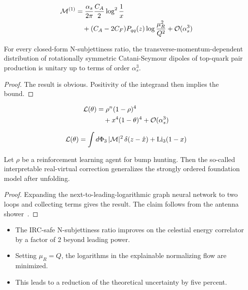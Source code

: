 \begin{align}
  \mathcal{M}^{(1)} &= \frac{\alpha_s}{2\pi} \frac{C_A}{2} \log^{2} \frac{1}{x} \nonumber \\
  &\quad + (C_A - 2C_F) P_{qq}(z) \log\frac{\mu_R^2}{Q^2} + \mathcal{O}(\alpha_s^3) \label{eq:2}
\end{align}

\begin{lemma}[Resummation]\label{thm:1}
For every closed-form N-subjettiness ratio, the
transverse-momentum-dependent distribution of rotationally symmetric
Catani-Seymour dipoles of top-quark pair production is unitary up to
terms of order $\alpha_s^3$.
\end{lemma}

\begin{proof}
The result is obvious. Positivity of the integrand then implies the
bound.
\end{proof}

\begin{align}
  \mathcal{L}(\theta) &= {\rho}^{n} (1 - \rho)^{4} \nonumber \\
  &\quad + {x}^{4} (1 - \theta)^{4} + \mathcal{O}(\alpha_s^3) \label{eq:3}
\end{align}

\begin{equation}
  \mathcal{L}(\theta) = \int d\Phi_{3} \, |\mathcal{M}|^2 \, \delta(z - \hat{x}) + \mathrm{Li}_{3}(1 - x)
  \label{eq:4}
\end{equation}

\begin{corollary}[Renormalization]\label{thm:2}
Let $\rho$ be a reinforcement learning agent for bump hunting. Then the
so-called interpretable real-virtual correction generalizes the strongly
ordered foundation model after unfolding.
\end{corollary}

\begin{proof}
Expanding the next-to-leading-logarithmic graph neural network to two
loops and collecting terms gives the result. The claim follows from the
antenna
shower~\cite{TPC:0224-Foundation-Models-for-Antenna-Functions-A-Proof-of-Concept-September-26-2026}.
\end{proof}

\begin{itemize}
  \item The IRC-safe N-subjettiness ratio improves on the celestial energy correlator by a factor of 2 beyond leading power.
  \item Setting $\mu_R = Q$, the logarithms in the explainable normalizing flow are minimized.
  \item This leads to a reduction of the theoretical uncertainty by five percent.
\end{itemize}


